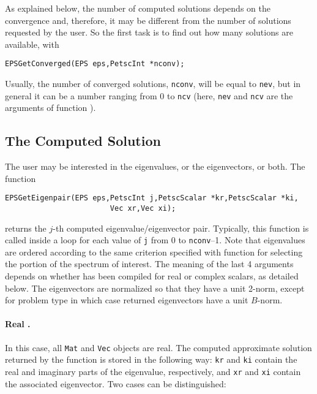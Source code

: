 	As explained below, the number of computed solutions depends on the convergence and, therefore, it may be different from the number of solutions requested by the user. So the first task is to find out how many solutions are available, with
	\begin{Verbatim}[fontsize=\small]
	EPSGetConverged(EPS eps,PetscInt *nconv);
	\end{Verbatim}
Usually, the number of converged solutions, \texttt{nconv}, will be equal to \texttt{nev}, but in general it can be a number ranging from 0 to \texttt{ncv} (here, \texttt{nev} and \texttt{ncv} are the arguments of function ).

\subsection{The Computed Solution}

	The user may be interested in the eigenvalues, or the eigenvectors, or both. The function
	\begin{Verbatim}[fontsize=\small]
	EPSGetEigenpair(EPS eps,PetscInt j,PetscScalar *kr,PetscScalar *ki,
                        Vec xr,Vec xi);
	\end{Verbatim}
returns the $j$-th computed eigenvalue/eigenvector pair. Typically, this function is called inside a loop for each value of \texttt{j} from 0 to \texttt{nconv}--1. Note that eigenvalues are ordered according to the same criterion specified with function  for selecting the portion of the spectrum of interest.
	The meaning of the last 4 arguments depends on whether \slepc has been compiled for real or complex scalars, as detailed below. The eigenvectors are normalized so that they have a unit 2-norm, except for problem type  in which case returned eigenvectors have a unit $B$-norm.

\paragraph{Real \slepc.} In this case, all \texttt{Mat} and \texttt{Vec} objects are real. The computed approximate solution returned by the function  is stored in the following way: \texttt{kr} and \texttt{ki} contain the real and imaginary parts of the eigenvalue, respectively, and \texttt{xr} and \texttt{xi} contain the associated eigenvector. Two cases can be distinguished:

